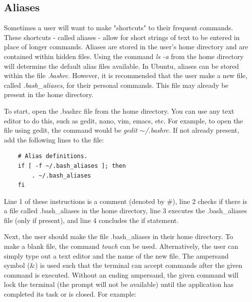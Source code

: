 \documentclass[12pt]{article}
\begin{document}
\subsection{Aliases}

\quad\enskip\quad Sometimes a user will want to make "shortcuts" to their frequent commands. These shortcuts - called aliases - allow for short strings of text to be entered in place of longer commands. Aliases are stored in the user's home directory and are contained within hidden files. Using the command \textit{ls -a} from the home directory will determine the default alias files available. In Ubuntu, aliases can be stored within the file \textit{.bashrc}. However, it is recommended that the user make a new file, called \textit{.bash\_aliases}, for their personal commands. This file may already be present in the home directory.

\quad To start, open the .bashrc file from the home directory. You can use any text editor to do this, such as gedit, nano, vim, emacs, etc. For example, to open the file using gedit, the command would be \textit{gedit $\sim$/.bashrc}. If not already present, add the following lines to the file:

\begin{lstlisting}
	# Alias definitions.
	if [ -f ~/.bash_aliases ]; then
	    . ~/.bash_aliases
	fi
\end{lstlisting}
\quad\enskip\quad Line 1 of these instructions is a comment (denoted by \#), line 2 checks if there is a file called .bash\_aliases in the home directory, line 3 executes the .bash\_aliases file (only if present), and line 4 concludes the if statement. 

\quad Next, the user should make the file .bash\_aliases in their home directory. To make a blank file, the command \textit{touch} can be used. Alternatively, the user can simply type out a text editor and the name of the new file. The ampersand symbol (\&) is used such that the terminal can accept commands after the given command is executed. Without an ending ampersand, the given command will lock the terminal (the prompt will not be available) until the application has completed its task or is closed. For example:
\end{document}
